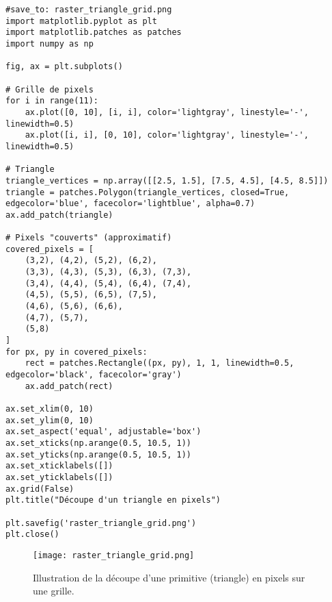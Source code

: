 \documentclass{article}
\begin{document}
\begin{verbatim}
#save_to: raster_triangle_grid.png
import matplotlib.pyplot as plt
import matplotlib.patches as patches
import numpy as np

fig, ax = plt.subplots()

# Grille de pixels
for i in range(11):
    ax.plot([0, 10], [i, i], color='lightgray', linestyle='-', linewidth=0.5)
    ax.plot([i, i], [0, 10], color='lightgray', linestyle='-', linewidth=0.5)

# Triangle
triangle_vertices = np.array([[2.5, 1.5], [7.5, 4.5], [4.5, 8.5]])
triangle = patches.Polygon(triangle_vertices, closed=True, edgecolor='blue', facecolor='lightblue', alpha=0.7)
ax.add_patch(triangle)

# Pixels "couverts" (approximatif)
covered_pixels = [
    (3,2), (4,2), (5,2), (6,2),
    (3,3), (4,3), (5,3), (6,3), (7,3),
    (3,4), (4,4), (5,4), (6,4), (7,4),
    (4,5), (5,5), (6,5), (7,5),
    (4,6), (5,6), (6,6),
    (4,7), (5,7),
    (5,8)
]
for px, py in covered_pixels:
    rect = patches.Rectangle((px, py), 1, 1, linewidth=0.5, edgecolor='black', facecolor='gray')
    ax.add_patch(rect)

ax.set_xlim(0, 10)
ax.set_ylim(0, 10)
ax.set_aspect('equal', adjustable='box')
ax.set_xticks(np.arange(0.5, 10.5, 1))
ax.set_yticks(np.arange(0.5, 10.5, 1))
ax.set_xticklabels([])
ax.set_yticklabels([])
ax.grid(False)
plt.title("Découpe d'un triangle en pixels")

plt.savefig('raster_triangle_grid.png')
plt.close()
\end{verbatim}

\begin{figure}[H]
\centering
\texttt{[image: raster\_triangle\_grid.png]}
\caption{Illustration de la découpe d'une primitive (triangle) en pixels sur une grille.}
\label{fig:raster_triangle_grid}
\end{figure}
\end{document}
